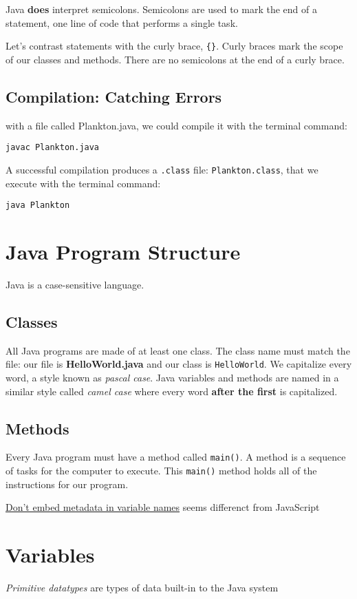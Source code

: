 \documentclass[a4paper, 12pt]{article}
\begin{document}
Java \textbf{does} interpret semicolons. Semicolons are used to mark the end of a statement, one line of code that performs a single task.

Let's contrast statements with the curly brace, \verb|{}|. Curly braces mark the scope of our classes and methods. There are no semicolons at the end of a curly brace.

\subsection{Compilation: Catching Errors}
with a file called Plankton.java, we could compile it with the terminal command:

\verb|javac Plankton.java|

A successful compilation produces a \verb|.class| file: \verb|Plankton.class|, that we execute with the terminal command:

\verb|java Plankton|


\section{Java Program Structure}
Java is a case-sensitive language.

\subsection{Classes}
All Java programs are made of at least one class. The class name must match the file: our file is \textbf{HelloWorld.java} and our class is \verb|HelloWorld|. We capitalize every word, a style known as \textit{pascal case}. Java variables and methods are named in a similar style called \textit{camel case} where every word \textbf{after the first} is capitalized.

\subsection{Methods}
Every Java program must have a method called \verb|main()|. A method is a sequence of tasks for the computer to execute. This \verb|main()| method holds all of the instructions for our program.

\href{https://github.com/twitter/commons/blob/master/src/java/com/twitter/common/styleguide.md#dont-embed-metadata-in-variable-names}{Don't embed metadata in variable names} seems differenct from JavaScript


\section{Variables}
\textit{Primitive datatypes} are types of data built-in to the Java system
\end{document}

